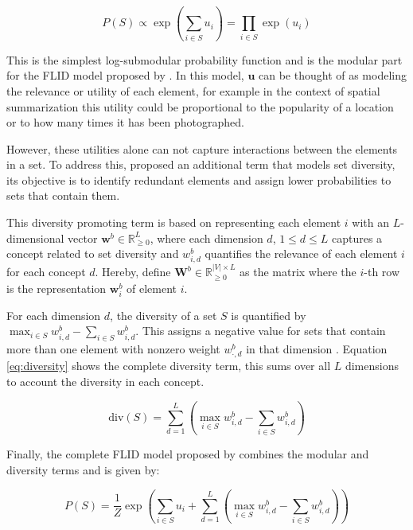 \begin{equation}
  \label{eq:modular}
  P(S) \propto \exp{\left(\sum_{i \in S}u_{i}\right)}= \prod_{i \in S} \exp{\left(u_{i}\right)}
\end{equation}

This is the simplest log-submodular probability function and is the modular part for the FLID model proposed by \citet{tschiatschek16learning}. In this model, $\mathbf{u}$ can be thought of as modeling the relevance or utility of each element, for example in the context of spatial summarization this utility could be proportional to the popularity of a location or to how many times it has been photographed.

However, these utilities alone can not capture interactions between the elements in a set. To address this, \citet{tschiatschek16learning} proposed an additional term that models set diversity, its objective is to identify redundant elements and assign lower probabilities to sets that contain them.

This diversity promoting term is based on representing each element $i$ with an $L$-dimensional vector $\mathbf{w}^{b} \in \mathbb{R}^{L}_{\geq 0}$, where each dimension $d$, $1 \leq d \leq L$ captures a concept related to set diversity and $w^{b}_{i,d}$ quantifies the relevance of each element $i$ for each concept $d$. Hereby, define $\mathbf{W}^{b} \in \mathbb{R}^{|V| \times L}_{\geq 0}$ as the matrix where the $i$-th row is the representation $\mathbf{w}^{b}_{i}$ of element $i$.

For each dimension $d$, the diversity of a set $S$ is quantified by $\max_{i \in S}{w^{b}_{i,d}} - \sum_{i \in S}{w^{b}_{i,d}}$. This assigns a negative value for sets that contain more than one element with nonzero weight $w^{b}_{\cdot,d}$ in that dimension \citep{tschiatschek16learning}. Equation \eqref{eq:diversity} shows the complete diversity term, this sums over all $L$ dimensions to account the diversity in each concept.

\begin{equation}
  \label{eq:diversity}
  \mathrm{div}(S) = \sum_{d=1}^{L}\left(\max_{i \in S}{w^{b}_{i, d}} - \sum_{i \in S}{w^{b}_{i,d}}\right)
\end{equation}

Finally, the complete FLID model proposed by \citet{tschiatschek16learning} combines the modular and diversity terms and is given by:

\begin{equation}
  \tag{FLID}
  P(S) = \frac{1}{Z}\exp{\left(\sum_{i \in S}u_{i} + \sum_{d=1}^{L}\left(\max_{i \in S}{w^{b}_{i, d}} - \sum_{i \in S}{w^{b}_{i,d}}\right)\right)}
  \label{eq:flid}
\end{equation}

